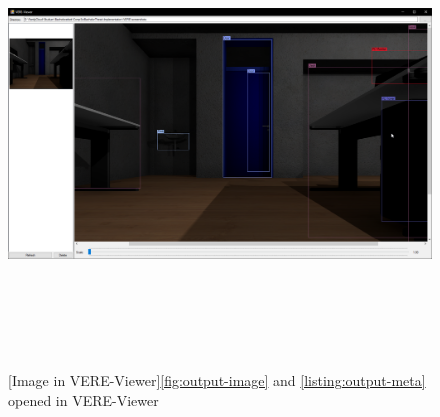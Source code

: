 \begin{figure}
    \centering
    \includegraphics[height=350pt]{appendix/VERE-Viewer_2019-01-29.png}
    [Image in VERE-Viewer]{\ref{fig:output-image} and \ref{listing:output-meta} opened in VERE-Viewer}
    \label{fig:output-viewer}
\end{figure}